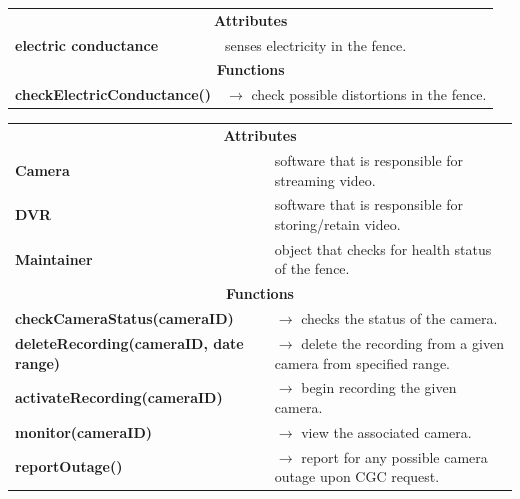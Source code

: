 \documentclass[12pt]{article}
\begin{document}
\begin{table}[H]
\begin{tabularx}{\hsize}{|X|X|}
    \hline
    \rowcolor{bigbrotheryellow}
    \multicolumn{2}{|c|}{\textbf{\texttt{ElectricFenceSensor}}} \\ 
    \hline
    \hline
    \multicolumn{2}{|c|}{\textbf{Attributes}}      \\
    \hline
    \textbf{electric conductance} & senses electricity in the fence. \\
    \hline
    \multicolumn{2}{|c|}{\textbf{Functions}} \\
    \hline
    \textbf{checkElectricConductance()} & $\rightarrow$ check possible distortions in the fence. \\
    \hline
\end{tabularx}
\end{table}

\begin{table}[H]
\begin{tabularx}{\hsize}{|X|X|}
    \hline
    \rowcolor{bigbrotheryellow}
    \multicolumn{2}{|c|}{\textbf{\texttt{CameraNetwork}}} \\ 
    \hline
    \hline
    \multicolumn{2}{|c|}{\textbf{Attributes}}      \\
    \hline
    \textbf{Camera} & software that is responsible for streaming video. \\
    \textbf{DVR} &  software that is responsible for storing/retain video.\\
    \textbf{Maintainer} &  object that checks for health status of the fence.\\
    \hline
    \multicolumn{2}{|c|}{\textbf{Functions}} \\
    \hline
    \textbf{checkCameraStatus(cameraID)} & $\rightarrow$ checks the status of the camera. \\
    \textbf{deleteRecording(cameraID, date range)} & $\rightarrow$ delete the recording from a given camera from specified range. \\
    \textbf{activateRecording(cameraID)} & $\rightarrow$ begin recording the given camera. \\
    \textbf{monitor(cameraID)} & $\rightarrow$ view the associated camera. \\
    \textbf{reportOutage()} & $\rightarrow$ report for any possible camera outage upon CGC request. \\
    \hline
\end{tabularx}
\end{table}
\end{document}

